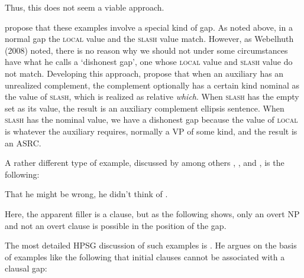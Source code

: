 \documentclass[output=paper
                ,modfonts
                ,nonflat
	        ,collection
	        ,collectionchapter
	        ,collectiontoclongg
 	        ,biblatex
                ,babelshorthands
                ,newtxmath
                ,draftmode
                ,colorlinks, citecolor=brown
]{./langsci/langscibook}
\begin{document}
{\begin{exe}
\begin{xlist}
\end{xlist}
\end{exe}

\noindent
Thus, this does not seem a viable approach.

\citet{Arnold:Borsley:10} propose that these examples involve a special
kind of gap. As noted above, in a normal gap the \textsc{local} value and the
\textsc{slash} value match. However, as Webelhuth (2008) noted, there is no
reason why we should not under some circumstances have what he calls a
`dishonest gap', one whose \textsc{local} value and \textsc{slash} value do not match.
Developing this approach, \citet{Arnold:Borsley:10} propose that when an
auxiliary has an unrealized complement, the complement optionally has a
certain kind nominal as the value of \textsc{slash}, which is realized as
relative \emph{which}. When \textsc{slash} has the empty set as its value, the
result is an auxiliary complement ellipsis sentence. When \textsc{slash} has the
nominal value, we have a dishonest gap because the value of \textsc{local} is
whatever the auxiliary requires, normally a VP of some kind, and the
result is an ASRC.

A rather different type of example, discussed by among others
\citet{Bresnan01}, \citet{Bouma:Malouf:Sag:01}, and \citet{Webelhuth:12},
is the following:

\begin{exe}
\ex  \label{ex:UDC:ThatHeMightBeWrong}  That he might be wrong, he didn't think of \gap{}.
\end{exe}

\noindent
Here, the apparent filler is a clause, but as the following shows, only
an overt NP and not an overt clause is possible in the position of the
gap.

\begin{exe}
\ex
\begin{xlist}
\end{xlist}
\end{exe}

\noindent
The most detailed HPSG discussion of such examples is \citet{Webelhuth:12}.
He argues on the basis of examples like the following that initial
clauses cannot be associated with a clausal gap:

\begin{exe} \ex \begin{xlist} 
\end{xlist}
\end{exe}

}
\end{document}
